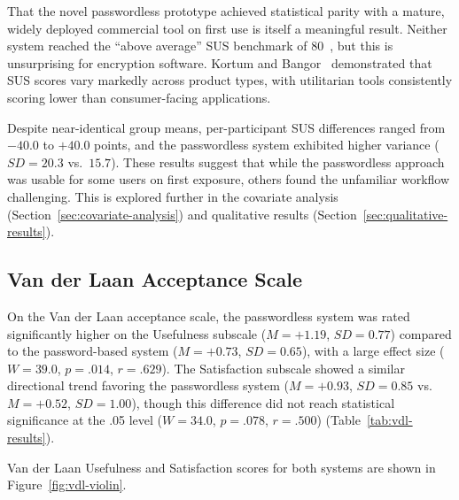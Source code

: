 
That the novel passwordless prototype achieved statistical parity with a mature, widely deployed commercial tool on first use is itself a meaningful result. Neither system reached the ``above average'' SUS benchmark of 80~\cite{sauro_lewis_2016}, but this is unsurprising for encryption software. Kortum and Bangor~\cite{kortum_bangor_2013} demonstrated that SUS scores vary markedly across product types, with utilitarian tools consistently scoring lower than consumer-facing applications.

Despite near-identical group means, per-participant SUS differences ranged from $-40.0$ to $+40.0$ points, and the passwordless system exhibited higher variance ($SD=20.3$ vs.\ $15.7$). These results suggest that while the passwordless approach was usable for some users on first exposure, others found the unfamiliar workflow challenging. This is explored further in the covariate analysis (Section~\ref{sec:covariate-analysis}) and qualitative results (Section~\ref{sec:qualitative-results}).

\subsection{Van der Laan Acceptance Scale}
\label{sec:vdl-results}

On the Van der Laan acceptance scale, the passwordless system was rated significantly higher on the Usefulness subscale ($M=+1.19$, $SD=0.77$) compared to the password-based system ($M=+0.73$, $SD=0.65$), with a large effect size ($W=39.0$, $p=.014$, $r=.629$). The Satisfaction subscale showed a similar directional trend favoring the passwordless system ($M=+0.93$, $SD=0.85$ vs.\ $M=+0.52$, $SD=1.00$), though this difference did not reach statistical significance at the .05 level ($W=34.0$, $p=.078$, $r=.500$) (Table~\ref{tab:vdl-results}).

Van der Laan Usefulness and Satisfaction scores for both systems are shown in Figure~\ref{fig:vdl-violin}.

